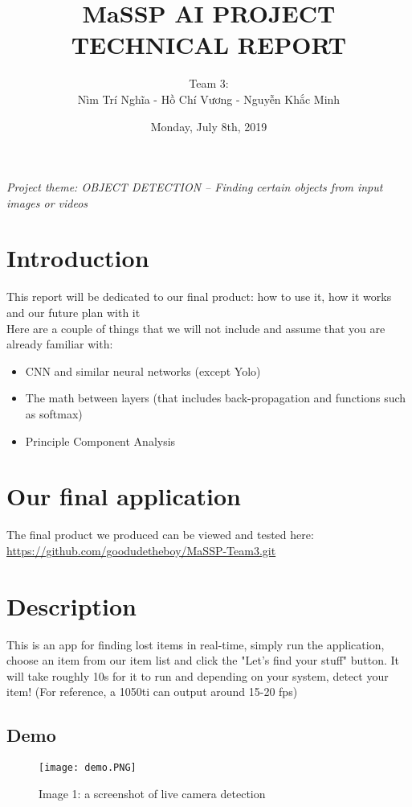 \documentclass{article}
\title{\textbf{MaSSP AI PROJECT TECHNICAL REPORT}}
\author{Team 3:\\
Nìm Trí Nghĩa - Hồ Chí Vương - Nguyễn Khắc Minh}
\date{Monday, July 8th, 2019}
\begin{document}
\maketitle
\newpage
\tableofcontents
\newpage
\textit{Project theme: OBJECT DETECTION – Finding certain objects from input images or videos} 
\graphicspath{ {./images/} }

\section{Introduction}
\tab This report will be dedicated to our final product: how to use it, how it works and our future plan with it\\
Here are a couple of things that we will not include and assume that you are already familiar with:
\begin{itemize}
	\item CNN and similar neural networks (except Yolo)
	\item The math between layers (that includes back-propagation and functions such as softmax)
	\item Principle Component Analysis
	
\end{itemize}


\section{Our final application}
The final product we produced can be viewed and tested here: \url{https://github.com/goodudetheboy/MaSSP-Team3.git}

\section{Description}
\tab This is an app for finding lost items in real-time, simply run the application, choose an item from our item list and click the "Let's find your stuff" button. It will take roughly 10s for it to run and depending on your system, detect your item! (For reference, a 1050ti can output around 15-20 fps)

\newpage
\subsection{Demo}
\begin{figure}[h!]
	\centerline{\texttt{[image: demo.PNG]}}
	\caption*{Image 1: a screenshot of live camera detection}
\end{figure}
\end{document}
